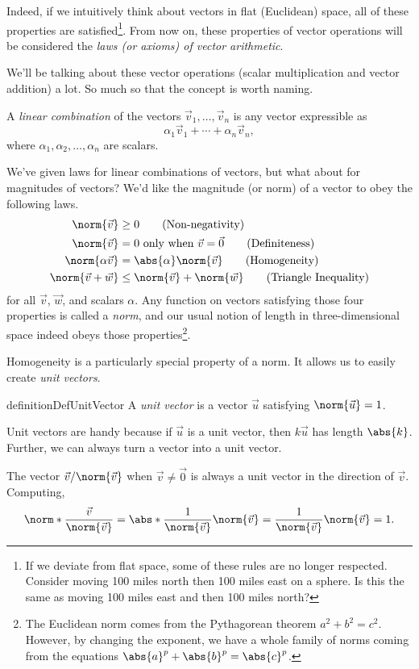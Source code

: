 Indeed, if we intuitively think about vectors in flat (Euclidean) space,
all of these properties are satisfied\footnote{
	If we deviate from flat space, some of these
	rules are no longer respected.  Consider moving 100 miles
	north then 100 miles east on a sphere.  Is this the
	same as moving 100 miles east and then 100 miles north?
}.  From now on, these properties of vector operations will be considered
the
\emph{laws (or axioms) of vector arithmetic}.

We'll be talking about these vector operations (scalar multiplication and
vector addition) a lot.  So much so that the concept is worth naming.
\begin{definition}
	A \emph{linear combination} of the vectors $\vec v_1,\ldots, \vec v_n$
	is any vector expressible as
	\[
		\alpha_1\vec v_1+\cdots +\alpha_n\vec v_n,
	\]
	where $\alpha_1,\alpha_2,\ldots,\alpha_n$ are scalars.
\end{definition}


We've given laws for linear combinations of vectors, but what about
for magnitudes of vectors?  We'd like the magnitude (or norm) of a vector to obey
the following laws.
\begin{align*}
	\norm{\vec v} &\geq 0\tag{Non-negativity}\\
	\norm{\vec v} &= 0\text{ only when }\vec v=\vec 0\tag{Definiteness}\\
	\norm{\alpha\vec v}&=\abs{\alpha}\norm{\vec v}\tag{Homogeneity}\\
	\norm{\vec v+\vec w}&\leq\norm{\vec v}+\norm{\vec w}\tag{Triangle Inequality}
\end{align*}
for all $\vec v$, $\vec w$, and scalars $\alpha$.  Any function on vectors satisfying
those four properties is called a \emph{norm}, and our usual notion
of length in three-dimensional space indeed obeys those properties\footnote{
	The Euclidean norm comes from the Pythagorean theorem $a^2+b^2=c^2$.
	However, by changing the exponent, we have a whole family of norms
	coming from the equations $\abs{a}^p+\abs{b}^p=\abs{c}^p$.
}.

Homogeneity is a particularly special property of a norm.  It allows us
to easily create \emph{unit vectors}.
\begin{restatable}{definition}{DefUnitVector}
	A \emph{unit vector} is a vector $\vec u$
	satisfying $\norm{\vec u}=1$.
\end{restatable}

Unit vectors are handy because if $\vec u$ is a unit vector, then $k\vec u$
has length $\abs{k}$.  Further, we can always turn a vector into a unit vector.
\begin{example}
	The vector $\vec v/\norm{\vec v}$ when $\vec v\neq\vec 0$ is always a unit vector in the direction
	of $\vec v$.  Computing,
	\[
		\norm*{\frac{\vec v}{\norm{\vec v}}} = \abs*{\frac{1}{\norm{\vec v}}}\norm{\vec v}=
		\frac{1}{\norm{\vec v}}\norm{\vec v}=1.
	\]
\end{example}

